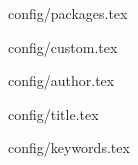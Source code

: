 \newcommand*{\RootDirectory}{"/Users/Mark/Documents/UW/Research/H5+/paper"}


\usepackage{import}

{config/packages.tex}

{config/custom.tex}

{config/author.tex}

{config/title.tex}

{config/keywords.tex}
